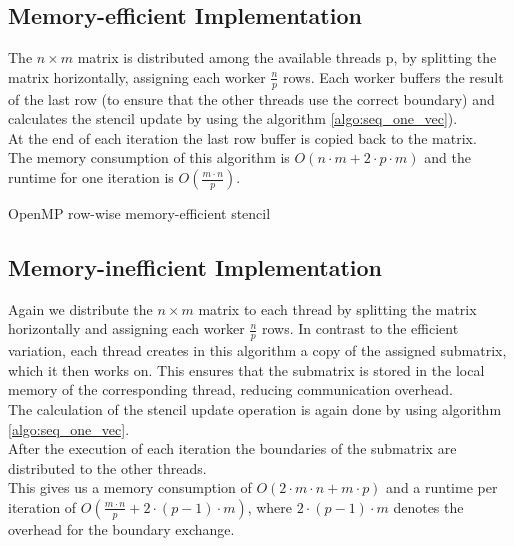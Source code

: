 \documentclass[11pt,a4paper]{article}
\begin{document}
\subsection{Memory-efficient Implementation}
The $n\times m$ matrix is distributed among the available threads p, by splitting the matrix horizontally, assigning each worker $\frac{n}{p}$ rows. Each worker buffers the result of the last row (to ensure that the other threads use the correct boundary) and calculates the stencil update by using the algorithm \ref{algo:seq_one_vec}).\\
At the end of each iteration the last row buffer is copied back to the matrix.\\
The memory consumption of this algorithm is $O(n \cdot m + 2 \cdot p \cdot m)$ and the runtime for one iteration is $O(\frac{m \cdot n}{p})$.\\

\begin{algorithm}[H] \label{algo:cilk}
 \caption{OpenMP row-wise memory-efficient stencil}
\end{algorithm}

\subsection{Memory-inefficient Implementation}
Again we distribute the $n\times m$ matrix to each thread by splitting the matrix horizontally and assigning each worker $\frac{n}{p}$ rows. In contrast to the efficient variation, each thread creates in this algorithm a copy of the assigned submatrix, which it then works on. This ensures that the submatrix is stored in the local memory of the corresponding thread, reducing communication overhead.\\
The calculation of the stencil update operation is again done by using algorithm \ref{algo:seq_one_vec}.\\
After the execution of each iteration the boundaries of the submatrix are distributed to the other threads.\\
This gives us a memory consumption of $O(2 \cdot m \cdot n + m \cdot p)$ and a runtime per iteration of $O(\frac{m \cdot n}{p} + 2 \cdot (p-1) \cdot m)$, where $2 \cdot (p-1) \cdot m$ denotes the overhead for the boundary exchange.\\
\end{document}
